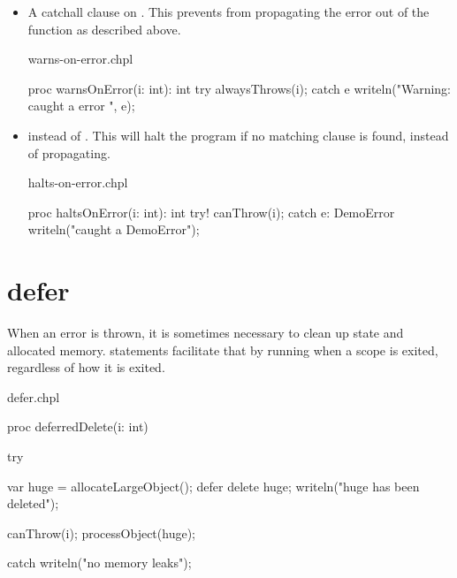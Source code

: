 \begin{itemize}

\item A catchall clause on . This prevents  from
propagating the error out of the function as described above.

\begin{chapelexample}{warns-on-error.chpl}
\begin{chapel}
proc warnsOnError(i: int): int {
  try {
    alwaysThrows(i);
  } catch e {
    writeln("Warning: caught a error ", e);
  }
}
\end{chapel}
\begin{chapelpost}
\end{chapelpost}
\begin{chapeloutput}
\end{chapeloutput}
\end{chapelexample}

\item
{} instead of . This will halt the program if no matching
 clause is found, instead of propagating.

\begin{chapelexample}{halts-on-error.chpl}
\begin{chapel}
proc haltsOnError(i: int): int {
  try! {
    canThrow(i);
  } catch e: DemoError {
    writeln("caught a DemoError");
  }
}
\end{chapel}
\begin{chapelpost}
\end{chapelpost}
\begin{chapeloutput}
\end{chapeloutput}
\end{chapelexample}

\end{itemize}

\section{defer}
\label{Errors_defer}

When an error is thrown, it is sometimes necessary to clean up state and
allocated memory.  statements facilitate that by running when a
scope is exited, regardless of how it is exited.

\begin{chapelexample}{defer.chpl}
\begin{chapel}
proc deferredDelete(i: int) {
  try {
    var huge = allocateLargeObject();
    defer {
      delete huge;
      writeln("huge has been deleted");
    }

    canThrow(i);
    processObject(huge);
  } catch {
    writeln("no memory leaks");
  }
}
\end{chapel}
\begin{chapelpost}
\end{chapelpost}
\begin{chapeloutput}
\end{chapeloutput}
\end{chapelexample}

